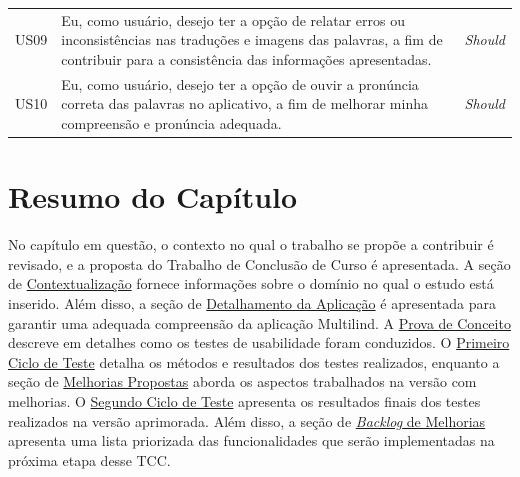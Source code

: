 \begin{table}[h!]
\begin{tabularx}{\textwidth}{p{1cm}|p{12cm}|p{1cm}}
	US09 & Eu, como usuário, desejo ter a opção de relatar erros ou inconsistências nas traduções e imagens das palavras, a fim de contribuir para a consistência das informações apresentadas.                                  & \textit{Should}      \\
	US10 & Eu, como usuário, desejo ter a opção de ouvir a pronúncia correta das palavras no aplicativo, a fim de melhorar minha compreensão e pronúncia adequada.                                                               & \textit{Should}      \\ \hline
	\end{tabularx}
\end{table}

\section{Resumo do Capítulo}
\label{sec:Resumo Proposta}
No capítulo em questão, o contexto no qual o trabalho se propõe a contribuir é revisado, e a proposta do Trabalho de Conclusão de Curso é apresentada. A seção de \hyperref[sec:Contextualização]{Contextualização} fornece informações sobre o domínio no qual o estudo está inserido. Além disso, 
a seção de \hyperref[sec:Detalhamento da Aplicacao]{Detalhamento da Aplicação} é apresentada para garantir uma adequada compreensão da aplicação Multilind. A \hyperref[sec:Prova de Conceito]{Prova de Conceito} descreve em detalhes como os testes de usabilidade foram conduzidos. O \hyperref[sec:Primeiro Ciclo]{Primeiro Ciclo de Teste} 
detalha os métodos e resultados dos testes realizados, enquanto a seção de \hyperref[sec:Melhorias Propostas]{Melhorias Propostas} aborda os aspectos trabalhados na versão com melhorias. O \hyperref[sec:Segundo Ciclo]{Segundo Ciclo de Teste} apresenta os resultados finais dos testes realizados na versão aprimorada. 
Além disso, a seção de \hyperref[sec:Backlog de Melhorias]{\textit{Backlog} de Melhorias} apresenta uma lista priorizada das funcionalidades que serão implementadas na próxima etapa desse TCC. 
